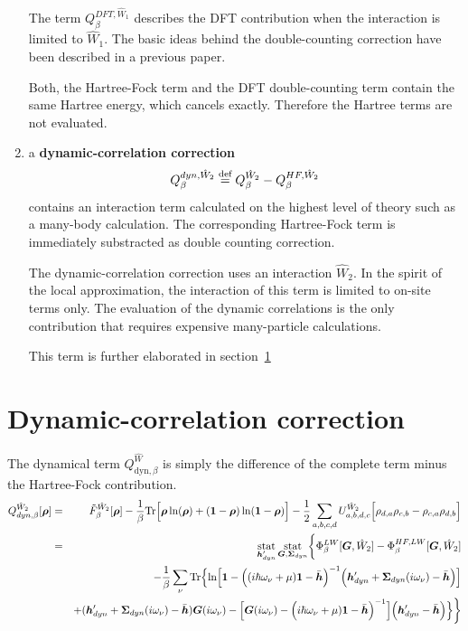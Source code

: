 \documentclass[11pt,a4paper]{report}
\begin{document}
\begin{enumerate}
  The term $Q^{DFT,\hat{W}_1}_\beta$ describes the DFT contribution
  when the interaction is limited to $\hat{W}_1$. The basic ideas
  behind the double-counting correction have been described in a
  previous paper\cite{bloechl11_prb84_205101}.

  Both, the Hartree-Fock term and the DFT double-counting term contain
  the same Hartree energy, which cancels exactly. Therefore the
  Hartree terms are not evaluated.
%
\item a \textbf{dynamic-correlation
  correction}
  \begin{eqnarray}
  Q^{dyn,\hat{W}_2}_\beta\stackrel{\text{def}}{=} Q^{\hat{W}_2}_\beta-Q^{HF,\hat{W}_2}_\beta
  \end{eqnarray}
  contains an interaction term calculated on the highest level of
  theory such as a many-body calculation. The corresponding
  Hartree-Fock term is immediately substracted as double counting
  correction.

  The dynamic-correlation correction uses an interaction
  $\hat{W}_2$. In the spirit of the local approximation, the
  interaction of this term is limited to on-site terms only. The
  evaluation of the dynamic correlations is the only contribution that
  requires expensive many-particle calculations.

  This term is further elaborated in section~\ref{sec:dyncorelcorr}
\end{enumerate}

\section{Dynamic-correlation correction}
\label{sec:dyncorelcorr}
The dynamical term
$Q_{\text{dyn},\beta}^{\hat{W}}$
is simply the difference of the complete term minus the Hartree-Fock
contribution.
\begin{eqnarray}
Q^{\hat{W}_2}_{dyn,\beta}[\bm{\rho}]
&=&\tilde{F}^{\hat{W}_2}_\beta[\bm{\rho}]
-
\frac{1}{\beta}\mathrm{Tr}\Bigl[
\bm{\rho}\ln(\bm{\rho})+(\bm{1}-\bm{\rho})\ln(\bm{1}-\bm{\rho})\Bigr]
-
\frac{1}{2}\sum_{a,b,c,d}U^{\hat{W}_2}_{a,b,d,c}
\Bigl[\rho_{d,a}\rho_{c,b}-\rho_{c,a}\rho_{d,b}\Bigr]
\nonumber\\
&=&
\operatorname*{stat}_{\bm{h}'_{dyn}}\operatorname*{stat}_{\bm{G},\bm{\Sigma}_{dyn}}
\biggl\lbrace
\Phi^{LW}_\beta[\bm{G},\hat{W}_2]-\Phi^{HF,LW}_\beta[\bm{G},\hat{W}_2]
\nonumber\\
&&-\frac{1}{\beta}\sum_\nu\mathrm{Tr}\Bigl\lbrace
\ln\Bigl[
\bm{1}-
\Bigl((i\hbar\omega_\nu+\mu)\bm{1}-\bar{\bm{h}}\Bigr)^{-1}
\Bigl(\bm{h}'_{dyn}+\bm{\Sigma}_{dyn}(i\omega_\nu)-\bar{\bm{h}}\Bigr)
\Bigr]
\nonumber\\&&
+(\bm{h}'_{dyn}+\bm{\Sigma}_{dyn}(i\omega_\nu)
-\bar{\bm{h}})\bm{G}(i\omega_\nu)
-
\Bigl[
\bm{G}(i\omega_\nu)
-\Bigl(i\hbar\omega_\nu+\mu)\bm{1}-\bar{\bm{h}}\Bigr)^{-1}
\Bigr]
\Bigl(\bm{h}'_{dyn}-\bar{\bm{h}}\Bigr)\Bigr\rbrace
\biggr\rbrace
\nonumber\\
\label{eq:dmf1greena}
\end{eqnarray}
\end{document}
